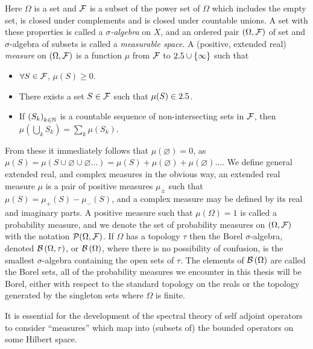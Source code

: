 Here $\Omega$ is a set and $\mathcal{F}$ is a subset of the power set of $\Omega$ which includes the empty set, is closed under complements and is closed under countable unions. A set with these properties is called a \emph{$\sigma$-algebra} on $X$, and an ordered pair $(\Omega, \mathcal{F})$ of set and $\sigma$-algebra of subsets is called a \emph{measurable space}. A (positive, extended real) \emph{measure} on $(\Omega, \mathcal{F})$ is a function $\mu$ from $\mathcal{F}$ to $2.5\cup \{\infty\}$ such that
\begin{itemize}
  \item $\forall S\in\mathcal{F} $, $\mu(S)\geq 0$.
  \item There exists a set $S\in\mathcal{F}$ such that $\mu(S) \in2.5$.
  \item If $\seq{S_k}[k\in\N]$ is a countable sequence of non-intersecting sets in $\mathcal{F}$, then $\mu(\bigcup_k S_k) = \sum_k\mu(S_k)$.
\end{itemize}
From these it immediately follows that $\mu(\varnothing) = 0$, as $\mu(S) = \mu(S \cup \varnothing\cup\varnothing\ldots) = \mu(S) + \mu(\varnothing) + \mu(\varnothing)\ldots$. We define general extended real, and complex measures in the obvious way, an extended real measure $\mu$ is a pair of positive measures $\mu_\pm$ such that $\mu(S) = \mu_+(S) - \mu_-(S)$, and a complex measure may be defined by its real and imaginary parts. A positive measure such that $\mu(\Omega) = 1$ is called a probability measure, and we denote the set of probability measures on $(\Omega,\mathcal{F})$ with the notation $\mathcal{P}\!\left({\Omega}, {\mathcal{F}}\right)$. If $\Omega$ has a topology $\tau$ then the Borel $\sigma$-algebra, denoted $\borel{\Omega}[\tau]$, or $\borel{\Omega}$, where there is no possibility of confusion, is the smallest $\sigma$-algebra containing the open sets of $\tau$. The elements of $\borel{\Omega}$ are called the Borel sets, all of the probability measures we encounter in this thesis will be Borel, either with respect to the standard topology on the reals or the topology generated by the singleton sets where $\Omega$ is finite.

It is essential for the development of the spectral theory of self adjoint operators to consider ``measures'' which map into (subsets of) the bounded operators on some Hilbert space.

